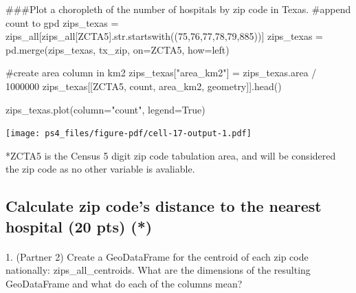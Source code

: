 \documentclass[
  letterpaper,
  DIV=11,
  numbers=noendperiod]{scrartcl}
\makeatletter
\let\oldparagraph\paragraph
\renewcommand{\paragraph}{
    \@ifstar
      \xxxParagraphStar
      \xxxParagraphNoStar
  }
\newcommand{\xxxParagraphStar}[1]{\oldparagraph*{#1}\mbox{}}
\newcommand{\xxxParagraphNoStar}[1]{\oldparagraph{#1}\mbox{}}
\newenvironment{Shaded}{\begin{snugshade}}{\end{snugshade}}
\newcommand{\BuiltInTok}[1]{\textcolor[rgb]{0.00,0.23,0.31}{#1}}
\newcommand{\CommentTok}[1]{\textcolor[rgb]{0.37,0.37,0.37}{#1}}
\newcommand{\DecValTok}[1]{\textcolor[rgb]{0.68,0.00,0.00}{#1}}
\newcommand{\NormalTok}[1]{\textcolor[rgb]{0.00,0.23,0.31}{#1}}
\newcommand{\OperatorTok}[1]{\textcolor[rgb]{0.37,0.37,0.37}{#1}}
\newcommand{\StringTok}[1]{\textcolor[rgb]{0.13,0.47,0.30}{#1}}
\newcommand{\VariableTok}[1]{\textcolor[rgb]{0.07,0.07,0.07}{#1}}
\makeatother
\begin{document}
\begin{Shaded}
\begin{Highlighting}[]
\CommentTok{\#\#\#Plot a choropleth of the number of hospitals by zip code in Texas.}
\CommentTok{\#append count to gpd}
\NormalTok{zips\_texas }\OperatorTok{=}\NormalTok{ zips\_all[zips\_all[}\StringTok{\textquotesingle{}ZCTA5\textquotesingle{}}\NormalTok{].}\BuiltInTok{str}\NormalTok{.startswith((}\StringTok{\textquotesingle{}75\textquotesingle{}}\NormalTok{,}\StringTok{\textquotesingle{}76\textquotesingle{}}\NormalTok{,}\StringTok{\textquotesingle{}77\textquotesingle{}}\NormalTok{,}\StringTok{\textquotesingle{}78\textquotesingle{}}\NormalTok{,}\StringTok{\textquotesingle{}79\textquotesingle{}}\NormalTok{,}\StringTok{\textquotesingle{}885\textquotesingle{}}\NormalTok{))]}
\NormalTok{zips\_texas }\OperatorTok{=}\NormalTok{ pd.merge(zips\_texas, tx\_zip, on}\OperatorTok{=}\StringTok{\textquotesingle{}ZCTA5\textquotesingle{}}\NormalTok{, how}\OperatorTok{=}\StringTok{\textquotesingle{}left\textquotesingle{}}\NormalTok{)}

\CommentTok{\#create area column in km2}
\NormalTok{zips\_texas[}\StringTok{"area\_km2"}\NormalTok{] }\OperatorTok{=}\NormalTok{ zips\_texas.area }\OperatorTok{/} \DecValTok{1000000} 
\NormalTok{zips\_texas[[}\StringTok{\textquotesingle{}ZCTA5\textquotesingle{}}\NormalTok{, }\StringTok{\textquotesingle{}count\textquotesingle{}}\NormalTok{, }\StringTok{\textquotesingle{}area\_km2\textquotesingle{}}\NormalTok{, }\StringTok{\textquotesingle{}geometry\textquotesingle{}}\NormalTok{]].head()}

\NormalTok{zips\_texas.plot(column}\OperatorTok{=}\StringTok{"count"}\NormalTok{, legend}\OperatorTok{=}\VariableTok{True}\NormalTok{)}
\end{Highlighting}
\end{Shaded}

\texttt{[image: ps4\_files/figure-pdf/cell-17-output-1.pdf]}

*ZCTA5 is the Census 5 digit zip code tabulation area, and will be
considered the zip code as no other variable is avaliable.

\subsection{Calculate zip code's distance to the nearest hospital (20
pts)
(*)}\label{calculate-zip-codes-distance-to-the-nearest-hospital-20-pts}

\paragraph{1. (Partner 2) Create a GeoDataFrame for the centroid of each
zip code nationally: zips\_all\_centroids. What are the dimensions of
the resulting GeoDataFrame and what do each of the columns
mean?}\label{partner-2-create-a-geodataframe-for-the-centroid-of-each-zip-code-nationally-zips_all_centroids.-what-are-the-dimensions-of-the-resulting-geodataframe-and-what-do-each-of-the-columns-mean}
\end{document}
